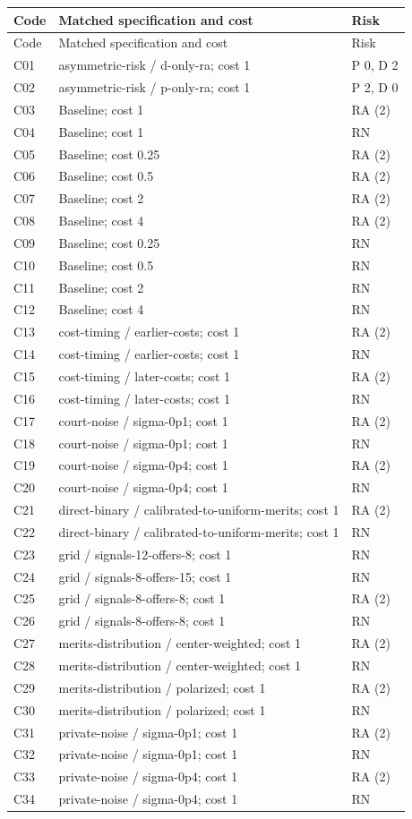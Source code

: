 \documentclass[10pt]{article}
\begin{document}
\small\begin{longtable}{@{}lp{5.4in}l@{}}\toprule Code & Matched specification and cost & Risk\\\midrule\endfirsthead
\toprule Code & Matched specification and cost & Risk\\\midrule\endhead\bottomrule\endfoot
C01 & asymmetric-risk / d-only-ra; cost 1 & P 0, D 2\\
C02 & asymmetric-risk / p-only-ra; cost 1 & P 2, D 0\\
C03 & Baseline; cost 1 & RA (2)\\
C04 & Baseline; cost 1 & RN\\
C05 & Baseline; cost 0.25 & RA (2)\\
C06 & Baseline; cost 0.5 & RA (2)\\
C07 & Baseline; cost 2 & RA (2)\\
C08 & Baseline; cost 4 & RA (2)\\
C09 & Baseline; cost 0.25 & RN\\
C10 & Baseline; cost 0.5 & RN\\
C11 & Baseline; cost 2 & RN\\
C12 & Baseline; cost 4 & RN\\
C13 & cost-timing / earlier-costs; cost 1 & RA (2)\\
C14 & cost-timing / earlier-costs; cost 1 & RN\\
C15 & cost-timing / later-costs; cost 1 & RA (2)\\
C16 & cost-timing / later-costs; cost 1 & RN\\
C17 & court-noise / sigma-0p1; cost 1 & RA (2)\\
C18 & court-noise / sigma-0p1; cost 1 & RN\\
C19 & court-noise / sigma-0p4; cost 1 & RA (2)\\
C20 & court-noise / sigma-0p4; cost 1 & RN\\
C21 & direct-binary / calibrated-to-uniform-merits; cost 1 & RA (2)\\
C22 & direct-binary / calibrated-to-uniform-merits; cost 1 & RN\\
C23 & grid / signals-12-offers-8; cost 1 & RN\\
C24 & grid / signals-8-offers-15; cost 1 & RN\\
C25 & grid / signals-8-offers-8; cost 1 & RA (2)\\
C26 & grid / signals-8-offers-8; cost 1 & RN\\
C27 & merits-distribution / center-weighted; cost 1 & RA (2)\\
C28 & merits-distribution / center-weighted; cost 1 & RN\\
C29 & merits-distribution / polarized; cost 1 & RA (2)\\
C30 & merits-distribution / polarized; cost 1 & RN\\
C31 & private-noise / sigma-0p1; cost 1 & RA (2)\\
C32 & private-noise / sigma-0p1; cost 1 & RN\\
C33 & private-noise / sigma-0p4; cost 1 & RA (2)\\
C34 & private-noise / sigma-0p4; cost 1 & RN\\
\end{longtable}\normalsize
\end{document}

